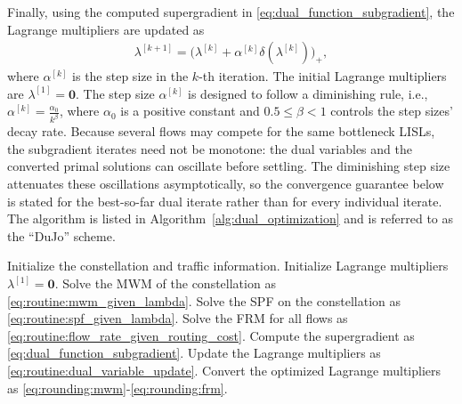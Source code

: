 \documentclass[journal]{IEEEtran}
\begin{document}
Finally, using the computed supergradient in \eqref{eq:dual_function_subgradient}, the Lagrange multipliers are updated as
\begin{equation}\label{eq:routine:dual_variable_update}
  \begin{aligned}
    \lambda^{[k+1]} = \big(\lambda^{[k]} + \alpha^{[k]} \delta(\lambda^{[k]})\big)_{+},
  \end{aligned}
\end{equation}
where $\alpha^{[k]}$ is the step size in the $k$-th iteration. The initial Lagrange multipliers are $\lambda^{[1]} = \mathbf{0}$.
The step size $\alpha^{[k]}$ is designed to follow a diminishing rule, i.e., $\alpha^{[k]} = \frac{\alpha_0}{k^\beta}$, where $\alpha_0$ is a positive constant and $0.5\leq\beta<1$ controls the step sizes' decay rate. Because several flows may compete for the same bottleneck LISLs, the subgradient iterates need not be monotone: the dual variables and the converted primal solutions can oscillate before settling. The diminishing step size attenuates these oscillations asymptotically, so the convergence guarantee below is stated for the best-so-far dual iterate rather than for every individual iterate. The algorithm is listed in Algorithm~\ref{alg:dual_optimization} and is referred to as the ``DuJo'' scheme.

\begin{algorithm}[!t]
\caption{Lagrangian Dual Optimization for Joint Link Matching and Traffic Routing (\textbf{DuJo}) in Mega-Constellation}\label{alg:dual_optimization}
\begin{algorithmic}[1]
\STATE Initialize the constellation and traffic information.
\STATE Initialize Lagrange multipliers $\lambda^{[1]} = \mathbf{0}$.
  \STATE Solve the MWM of the constellation as \eqref{eq:routine:mwm_given_lambda}.
  \STATE Solve the SPF on the constellation as \eqref{eq:routine:spf_given_lambda}.
  \STATE Solve the FRM for all flows as \eqref{eq:routine:flow_rate_given_routing_cost}.
  \STATE Compute the supergradient as \eqref{eq:dual_function_subgradient}.
  \STATE Update the Lagrange multipliers as \eqref{eq:routine:dual_variable_update}.
\ENDFOR
\STATE Convert the optimized Lagrange multipliers as \eqref{eq:rounding:mwm}-\eqref{eq:rounding:frm}.
\end{algorithmic}
\end{algorithm}
\end{document}

